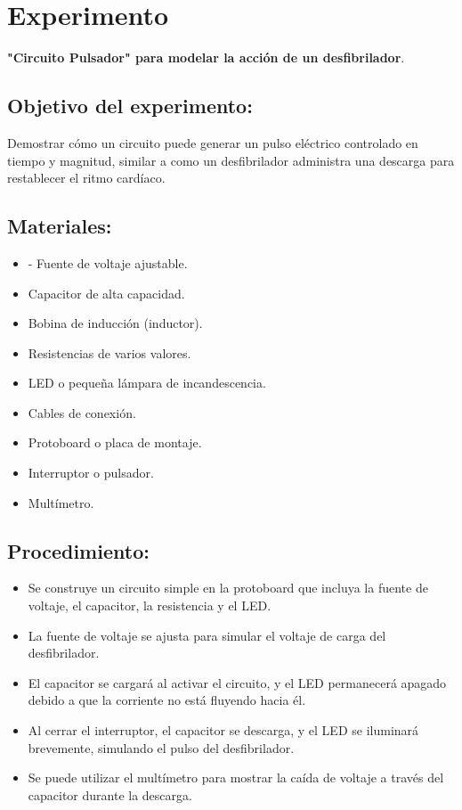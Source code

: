 \newpage
\section{Experimento}

\textbf{"Circuito Pulsador" para modelar la acción de un desfibrilador}.
\subsection{Objetivo del experimento:}
Demostrar cómo un circuito puede generar un pulso eléctrico controlado en tiempo y magnitud, similar a como un desfibrilador administra una descarga para restablecer el ritmo cardíaco.
\subsection{Materiales:}
\begin{itemize}
    \item - Fuente de voltaje ajustable.
    \item Capacitor de alta capacidad.
    \item Bobina de inducción (inductor).
    \item Resistencias de varios valores.
    \item LED o pequeña lámpara de incandescencia.
    \item Cables de conexión.
    \item Protoboard o placa de montaje.
    \item Interruptor o pulsador.
    \item Multímetro.
\end{itemize}

\subsection{Procedimiento:}
\begin{itemize}
    \item Se construye un circuito simple en la protoboard que incluya la fuente de voltaje, el capacitor, la resistencia y el LED.
    \item La fuente de voltaje se ajusta para simular el voltaje de carga del desfibrilador.
    \item El capacitor se cargará al activar el circuito, y el LED permanecerá apagado debido a que la corriente no está fluyendo hacia él.
    \item Al cerrar el interruptor, el capacitor se descarga, y el LED se iluminará brevemente, simulando el pulso del desfibrilador.
    \item Se puede utilizar el multímetro para mostrar la caída de voltaje a través del capacitor durante la descarga.
\end{itemize}

